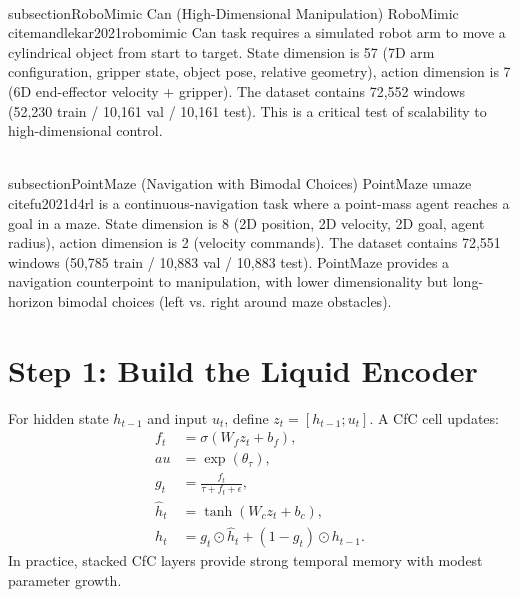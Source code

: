 \documentclass{article}
\begin{document}
\\subsection{RoboMimic Can (High-Dimensional Manipulation)}
RoboMimic~\\cite{mandlekar2021robomimic} Can task requires a simulated robot arm to move a cylindrical object from start to target. State dimension is 57 (7D arm configuration, gripper state, object pose, relative geometry), action dimension is 7 (6D end-effector velocity + gripper). The dataset contains 72,552 windows (52,230 train / 10,161 val / 10,161 test). This is a critical test of scalability to high-dimensional control.

\\subsection{PointMaze (Navigation with Bimodal Choices)}
PointMaze umaze~\\cite{fu2021d4rl} is a continuous-navigation task where a point-mass agent reaches a goal in a maze. State dimension is 8 (2D position, 2D velocity, 2D goal, agent radius), action dimension is 2 (velocity commands). The dataset contains 72,551 windows (50,785 train / 10,883 val / 10,883 test). PointMaze provides a navigation counterpoint to manipulation, with lower dimensionality but long-horizon bimodal choices (left vs. right around maze obstacles).

\section{Step 1: Build the Liquid Encoder}
For hidden state $h_{t-1}$ and input $u_t$, define $z_t=[h_{t-1};u_t]$. A CfC cell updates:
\begin{align}
f_t &= \sigma(W_f z_t+b_f), \\
    au &= \exp(\theta_\tau), \\
g_t &= \frac{f_t}{\tau+f_t+\epsilon}, \\
\hat{h}_t &= \tanh(W_c z_t+b_c), \\
h_t &= g_t\odot\hat{h}_t + (1-g_t)\odot h_{t-1}.
\end{align}
In practice, stacked CfC layers provide strong temporal memory with modest parameter growth.
\end{document}
